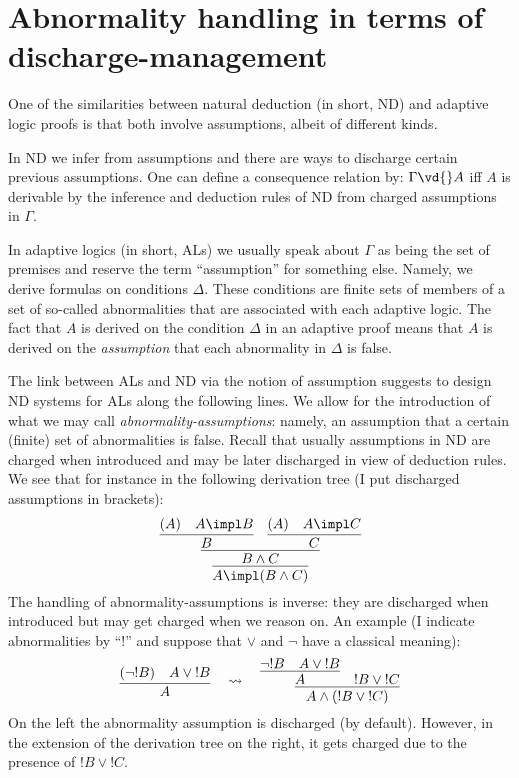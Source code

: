 \section{Abnormality handling in terms of
  discharge-management}

One of the similarities between natural deduction (in short,
ND) and adaptive logic proofs is that both involve
assumptions, albeit of different kinds.

In ND we infer from assumptions and there are ways to
discharge certain previous assumptions. One can define a
consequence relation by: $\Gamma \vd{} A$ iff $A$ is
derivable by the inference and deduction rules of ND from
charged assumptions in $\Gamma$.

In adaptive logics (in short, ALs) we usually speak about
$\Gamma$ as being the set of premises and reserve the term
``assumption'' for something else. Namely, we derive formulas
on conditions $\Delta$. These conditions are finite sets of
members of a set of so-called abnormalities that are
associated with each adaptive logic. The fact that $A$ is
derived on the condition $\Delta$ in an adaptive proof means
that $A$ is derived on the \emph{assumption} that each
abnormality in $\Delta$ is false.

The link between ALs and ND via the notion of assumption
suggests to design ND systems for ALs along the following
lines. We allow for the introduction of what we may call
\emph{abnormality-assumptions}: namely, an assumption that a
certain (finite) set of abnormalities is false. Recall that
usually assumptions in ND are charged when introduced and may
be later discharged in view of deduction rules. We see that
for instance in the following derivation tree (I put
discharged assumptions in brackets):
\begin{equation*}
  \infer{A \impl (B\wedge C)}{\infer{B \wedge
      C}{\infer{B}{(A) & A \impl B} & \infer{C}{(A) & A \impl
      C}}}
\end{equation*}
The handling of abnormality-assumptions is inverse: they are
discharged when introduced but may get charged when we reason
on. An example (I indicate abnormalities by ``!'' and suppose
that $\vee$ and $\neg$ have a classical meaning):
\begin{equation*}
  \vcenter{\infer{A}{(\neg !B) & A \vee {!}B}} ~~~\leadsto~~~ %
  \vcenter{\infer{A \wedge (!B \vee {!}C)}{\infer{A}{\neg !B
        & A \vee {!}B} & !B \vee {!}C}}
\end{equation*}
On the left the abnormality assumption is discharged (by
default). However, in the extension of the derivation tree on
the right, it gets charged due to the presence of $!B \vee
{!}C$.

